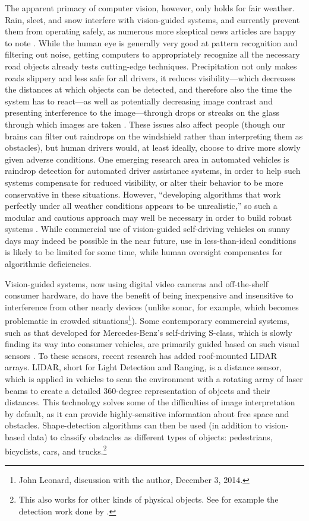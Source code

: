 The apparent primacy of computer vision, however, only holds for fair
weather. Rain, sleet, and 
snow interfere with vision-guided systems, and currently prevent them
from operating safely, as numerous more skeptical news articles are
happy to note \cite{knightFurther} \cite{gomesObstacles}.  While the
human eye is generally very good at
pattern recognition and filtering out noise, getting computers to
appropriately recognize all 
the necessary road objects already tests
cutting-edge techniques. Precipitation not only makes roads slippery
and less safe for all drivers, it reduces visibility---which decreases
the distances at which objects can be detected, and therefore also the
time the system has to react---as well as potentially decreasing image
contrast and presenting interference to the image---through drops or
streaks on the glass through which images are taken
\cite{rainADAS}. These issues also 
affect people (though our brains can filter out raindrops on the
windshield rather than interpreting them as obstacles), but human
drivers would, at least ideally, choose to drive more slowly given
adverse conditions. One emerging research area
in automated vehicles is raindrop detection for automated driver
assistance systems, in order to help such systems compensate for
reduced visibility, or alter their behavior to be more conservative in
these situations. However, ``developing algorithms that work perfectly
under all weather conditions appears to be unrealistic,'' so such a
modular and cautious approach may well be necessary in order to build
robust systems \cite[p. 50]{rainADAS}. While commercial use of
vision-guided self-driving vehicles on 
sunny days may indeed be possible in the near future, use in
less-than-ideal conditions is likely to be limited for some time,
while human oversight compensates for algorithmic deficiencies. 

Vision-guided systems, now using digital video cameras and
off-the-shelf consumer hardware, do have the benefit of being inexpensive
and insensitive to interference from other nearly devices (unlike
sonar, for example, which becomes problematic in crowded
situations\footnote{John Leonard, discussion with the author, December
3, 2014.}). Some contemporary commercial systems, such as that developed for Mercedes-Benz's
self-driving S-class, which is slowly finding its way into consumer
vehicles, are primarily guided based on such visual sensors \cite{makingBertha}. To
these sensors, recent research has added roof-mounted LIDAR arrays.
LIDAR, short for Light Detection and Ranging, is a distance
sensor, which is applied in vehicles to scan the environment with a
rotating array of laser beams to create a detailed 360-degree
representation of objects and their distances. This technology
solves some of the difficulties of image interpretation by default, as
it can provide highly-sensitive information about free space and
obstacles. Shape-detection algorithms can then be used (in addition to
vision-based data) to classify obstacles as different types of
objects: pedestrians, bicyclists, cars, and trucks.\footnote{This also
  works for other kinds of physical objects. See for example the
  detection work done by \cite{fukuda}.}

